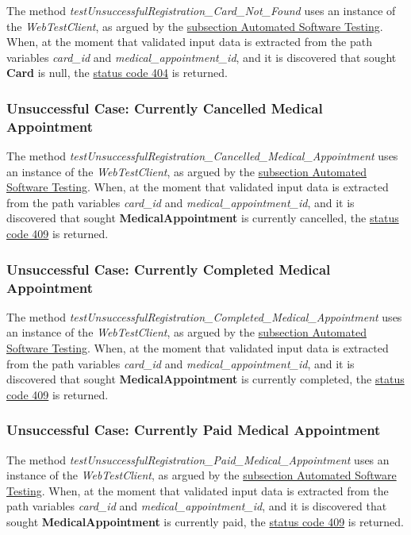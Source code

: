 The method \textit{testUnsuccessfulRegistration\_Card\_Not\_Found} uses an instance of the \textit{WebTestClient}, as argued by the \hyperref[subsection:automated_software_testing]{subsection Automated Software Testing}. When, at the moment that validated input data is extracted from the path variables \textit{card\_id}  and \textit{medical\_appointment\_id}, and it is discovered that sought \textbf{Card} is null, the \hyperref[tab:summary_http_status_codes]{status code 404} is returned.


\subsubsection{Unsuccessful Case: Currently Cancelled Medical Appointment}

The method \textit{testUnsuccessfulRegistration\_Cancelled\_Medical\_Appointment} uses an instance of the \textit{WebTestClient}, as argued by the \hyperref[subsection:automated_software_testing]{subsection Automated Software Testing}. When, at the moment that validated input data is extracted from the path variables \textit{card\_id}  and \textit{medical\_appointment\_id}, and it is discovered that sought \textbf{MedicalAppointment} is currently cancelled, the \hyperref[tab:summary_http_status_codes]{status code 409} is returned.

\subsubsection{Unsuccessful Case: Currently Completed Medical Appointment}

The method \textit{testUnsuccessfulRegistration\_Completed\_Medical\_Appointment} uses an instance of the \textit{WebTestClient}, as argued by the \hyperref[subsection:automated_software_testing]{subsection Automated Software Testing}. When, at the moment that validated input data is extracted from the path variables \textit{card\_id}  and \textit{medical\_appointment\_id}, and it is discovered that sought \textbf{MedicalAppointment} is currently completed, the \hyperref[tab:summary_http_status_codes]{status code 409} is returned.

\subsubsection{Unsuccessful Case: Currently Paid Medical Appointment}

The method \textit{testUnsuccessfulRegistration\_Paid\_Medical\_Appointment} uses an instance of the \textit{WebTestClient}, as argued by the \hyperref[subsection:automated_software_testing]{subsection Automated Software Testing}. When, at the moment that validated input data is extracted from the path variables \textit{card\_id}  and \textit{medical\_appointment\_id}, and it is discovered that sought \textbf{MedicalAppointment} is currently paid, the \hyperref[tab:summary_http_status_codes]{status code 409} is returned.

